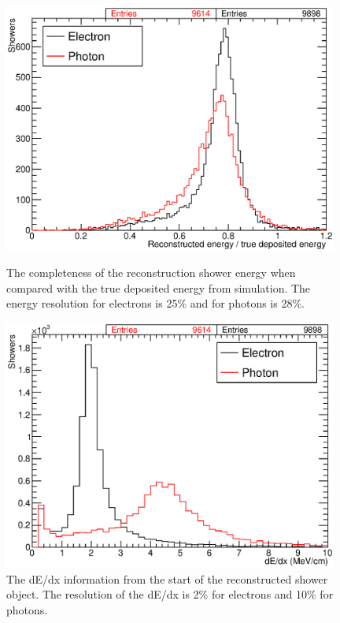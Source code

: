 \begin{figure}
  \begin{minipage}[t]{0.48\linewidth}
    \centering
    \includegraphics[width=0.98\textwidth]{ShowerDepositedEnergy.eps}
    \caption[The completeness of the reconstruction shower energy when compared with the true deposited energy from simulation.]{The completeness of the reconstruction shower energy when compared with the true deposited energy from simulation.  The energy resolution for electrons is 25\% and for photons is 28\%.}
    \label{fig:ShowerEnergy}
  \end{minipage}
  \hfill
  \begin{minipage}[t]{0.48\linewidth}
    \centering
    \includegraphics[width=0.98\textwidth]{ShowerdEdx.eps}
    \caption[The dE/dx information from the start of the reconstructed shower object.]{The dE/dx information from the start of the reconstructed shower object.  The resolution of the dE/dx is 2\% for electrons and 10\% for photons.}
    \label{fig:ShowerdEdx}
  \end{minipage}
\end{figure}

